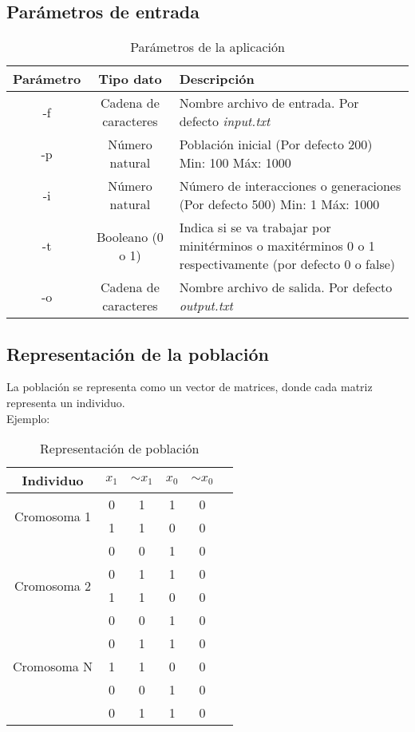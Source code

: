 \documentclass[a4paper]{article}
\begin{document}
\subsection{Parámetros de entrada}

\begin{table}[H]
	\centering
	\caption{Parámetros de la aplicación}
	\begin{tabular}{|c|c|p{5cm}|}
		\hline
		\textbf{Parámetro} & \textbf{Tipo dato} & \textbf{Descripción}\\
		\hline
		-f & Cadena de caracteres & Nombre archivo de entrada. Por defecto \textit{input.txt}\\
		\hline
		-p & Número natural & Población inicial (Por defecto 200) Min: 100 Máx: 1000\\
		\hline
		-i & Número natural & Número de interacciones o generaciones (Por defecto 500) Min: 1 Máx: 1000\\
		\hline
		-t & Booleano (0 o 1) & Indica si se va trabajar por minitérminos o maxitérminos 0 o 1 respectivamente (por defecto 0 o false)\\
		\hline
		-o & Cadena de caracteres & Nombre archivo de salida. Por defecto \textit{output.txt} \\
		\hline
	\end{tabular}
\end{table}

\subsection{Representación de la población}

La población se representa como un vector de matrices, donde cada matriz representa un individuo.\\
Ejemplo:
\begin{table}[H]
	\centering
	\caption{Representación de población}
	\begin{tabular}{| c |c | c | c|  c|  c|}
		\hline
		Individuo & $x_1$ & $ \sim{x_1}$ & $x_0$ & $ \sim{x_0}$\\
		\hline
		\multirow{2}{4cm}{Cromosoma 1} &0 & 1& 1 & 0\\
		\cline{2-5}
		& 1 & 1& 0 & 0\\
		\cline{2-5}
		& 0 & 0& 1 & 0\\
		\hline
		\hline
		\multirow{2}{4cm}{Cromosoma 2}  & 0 & 1& 1 & 0\\
		\cline{2-5}
		& 1 & 1& 0 & 0\\
		\cline{2-5}
		& 0 & 0& 1 & 0\\
		\hline
		\hline
		\multirow{3}{4cm}{Cromosoma N}  & 0 & 1& 1 & 0\\
		\cline{2-5}
		& 1 & 1& 0 & 0\\
		\cline{2-5}
		& 0 & 0& 1 & 0\\
		\cline{2-5}
		& 0 & 1& 1 & 0\\
		\hline
	\end{tabular}
\end{table}
\end{document}
